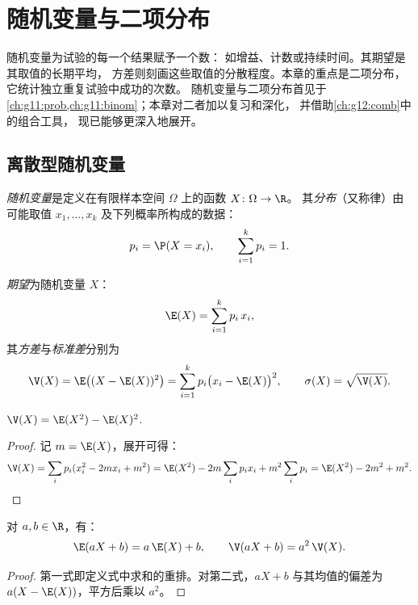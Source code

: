 \chapter{随机变量与二项分布}\label{ch:g12:randvar}

随机变量为试验的每一个结果赋予一个数：
如增益、计数或持续时间。其期望是其取值的长期平均，
方差则刻画这些取值的分散程度。本章的重点是二项分布，
它统计独立重复试验中成功的次数。
随机变量与二项分布首见于
\cref{ch:g11:prob,ch:g11:binom}；本章对二者加以复习和深化，
并借助\cref{ch:g12:comb}中的组合工具，
现已能够更深入地展开。

\section{离散型随机变量}

\begin{definition}[随机变量，分布]\label{def:g12:randvar:rv}
\emph{随机变量}是定义在有限样本空间
$\Omega$ 上的函数 $X \colon \Omega \to \R$。
其\emph{分布}（又称律）由可能取值
$x_1, \dots, x_k$ 及下列概率所构成的数据：
\[
p_i = \P(X = x_i), \qquad \sum_{i=1}^{k} p_i = 1 .
\]
\end{definition}

\begin{definition}[期望、方差与标准差]\label{def:g12:randvar:exp}
\emph{期望}为随机变量 $X$：
\[
\E(X) = \sum_{i=1}^{k} p_i\, x_i ,
\]
其\emph{方差}与\emph{标准差}分别为
\[
\V(X) = \E\bigl((X - \E(X))^2\bigr) = \sum_{i=1}^k p_i\bigl(x_i - \E(X)\bigr)^2,
\qquad
\sigma(X) = \sqrt{\V(X)} .
\]
\end{definition}

\begin{proposition}\label{prop:g12:randvar:konig}
$\V(X) = \E(X^2) - \E(X)^2$.
\end{proposition}

\begin{proof}
记 $m = \E(X)$，展开可得：
\[
\V(X) = \sum_i p_i (x_i^2 - 2m x_i + m^2)
= \E(X^2) - 2m\sum_i p_i x_i + m^2\sum_i p_i
= \E(X^2) - 2m^2 + m^2 . \qedhere
\]
\end{proof}

\begin{proposition}[仿射变换]\label{prop:g12:randvar:affine}
对 $a, b \in \R$，有：
\[
\E(aX + b) = a\,\E(X) + b, \qquad
\V(aX + b) = a^2\,\V(X) .
\]
\end{proposition}

\begin{proof}
第一式即定义式中求和的重排。对第二式，$aX + b$
与其均值的偏差为 $a(X - \E(X))$，平方后乘以
$a^2$。
\end{proof}

